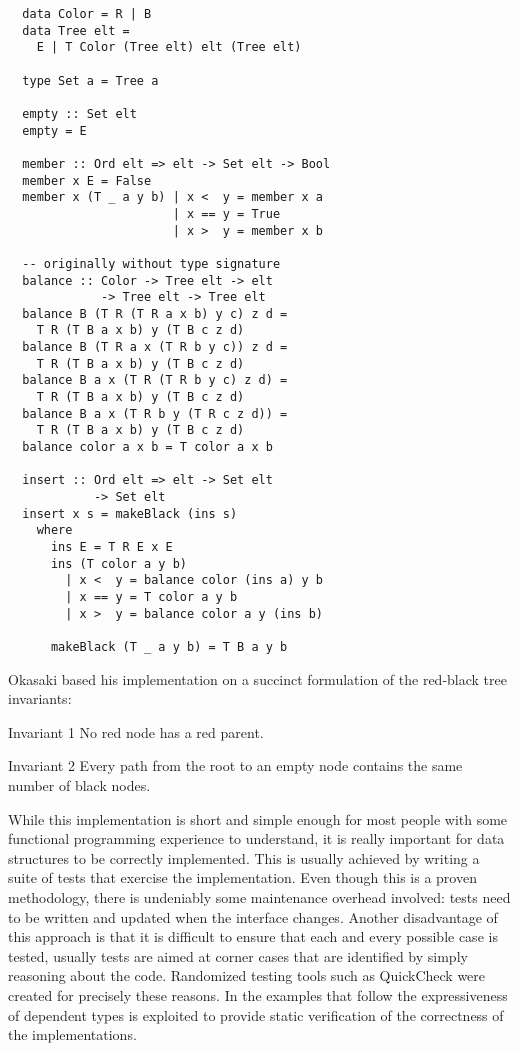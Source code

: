\documentclass[journal, retainorgcmds]{IEEEtran}
\begin{document}
\begin{verbatim}
  data Color = R | B
  data Tree elt =
    E | T Color (Tree elt) elt (Tree elt)

  type Set a = Tree a

  empty :: Set elt
  empty = E

  member :: Ord elt => elt -> Set elt -> Bool
  member x E = False
  member x (T _ a y b) | x <  y = member x a
                       | x == y = True
                       | x >  y = member x b

  -- originally without type signature
  balance :: Color -> Tree elt -> elt
             -> Tree elt -> Tree elt
  balance B (T R (T R a x b) y c) z d =
    T R (T B a x b) y (T B c z d)
  balance B (T R a x (T R b y c)) z d =
    T R (T B a x b) y (T B c z d)
  balance B a x (T R (T R b y c) z d) =
    T R (T B a x b) y (T B c z d)
  balance B a x (T R b y (T R c z d)) =
    T R (T B a x b) y (T B c z d)
  balance color a x b = T color a x b

  insert :: Ord elt => elt -> Set elt
            -> Set elt
  insert x s = makeBlack (ins s)
    where
      ins E = T R E x E
      ins (T color a y b)
        | x <  y = balance color (ins a) y b
        | x == y = T color a y b
        | x >  y = balance color a y (ins b)

      makeBlack (T _ a y b) = T B a y b
\end{verbatim}

Okasaki based his implementation on a succinct formulation of the red-black tree
invariants:
\begin{LaTeXdescription}
  \item[Invariant 1] No red node has a red parent.
  \item[Invariant 2] Every path from the root to an empty node contains the
                     same number of black nodes.
\end{LaTeXdescription}
While this implementation is short and simple enough for most people with some
functional programming experience to understand, it is really important for
data structures to be correctly implemented.
This is usually achieved by writing a suite of tests that exercise the
implementation.
Even though this is a proven methodology, there is undeniably some maintenance
overhead involved: tests need to be written and updated when the interface
changes.
Another disadvantage of this approach is that it is difficult to ensure that
each and every possible case is tested, usually tests are aimed at corner cases
that are identified by simply reasoning about the code.
Randomized testing tools such as QuickCheck \cite{quickcheck} were created for
precisely these reasons.
In the examples that follow the expressiveness of dependent types is exploited
to provide static verification of the correctness of the implementations.
\end{document}
